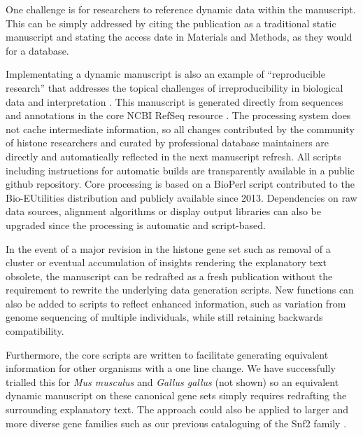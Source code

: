   One challenge is for researchers to reference dynamic data within the manuscript.
  This can be simply addressed by citing the publication as a traditional static manuscript
  and stating the access date in Materials and Methods, as they would for a database.

  Implementating a dynamic manuscript is also an example of ``reproducible research''
  \citep{reproducible-research-bioinformatics,reproducible-research-law}
  that addresses the topical challenges of irreproducibility in biological data
  and interpretation \citep{ErrorProne2012,OpenPrograms2012}.
  This manuscript is generated directly from sequences and annotations
  in the core NCBI RefSeq resource \citep{PruittRefseq2014}.
  The processing system does not cache intermediate information,
  so all changes contributed by the community of histone researchers
  and curated by professional database maintainers
  are directly and automatically reflected in the next manuscript refresh.
  All scripts including instructions for automatic builds
  are transparently available in a public github repository.
  Core processing is based on a BioPerl script contributed to the Bio-EUtilities distribution
  and publicly available since 2013.
  Dependencies on raw data sources, alignment algorithms or display output libraries
  can also be upgraded since the processing is automatic and script-based.

  In the event of a major revision in the histone gene set such as removal of a cluster
  or eventual accumulation of insights rendering the explanatory text obsolete,
  the manuscript can be redrafted as a fresh publication
  without the requirement to rewrite the underlying data generation scripts.
  New functions can also be added to scripts to reflect enhanced information,
  such as variation from genome sequencing of multiple individuals,
  while still retaining backwards compatibility.

  Furthermore, the core scripts are written to facilitate generating
  equivalent information for other organisms with a one line change.
  We have successfully trialled this for \textit{Mus musculus}
  and \textit{Gallus gallus} (not shown)
  so an equivalent dynamic manuscript on these canonical gene sets
  simply requires redrafting the surrounding explanatory text.
  The approach could also be applied to larger and more diverse gene families such as
  our previous cataloguing of the Snf2 family \citep{andrew-snf2-catalogue}.
